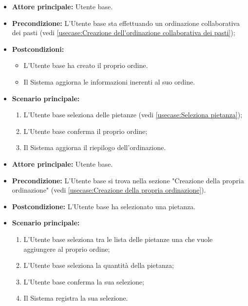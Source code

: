 \label{usecase:Creazione della propria ordinazione}
\begin{itemize}
	\item \textbf{Attore principale:} Utente base.

	\item \textbf{Precondizione:} L'Utente base sta effettuando un ordinazione collaborativa dei pasti (vedi \autoref{usecase:Creazione dell'ordinazione collaborativa dei pasti});

	\item \textbf{Postcondizioni:}
	      \begin{itemize}
		      \item L'Utente base ha creato il proprio ordine.
		      \item Il Sistema aggiorna le informazioni inerenti al suo ordine.
	      \end{itemize}

	\item \textbf{Scenario principale:}
	      \begin{enumerate}
		      \item L'Utente base seleziona delle pietanze (vedi \autoref{usecase:Seleziona pietanza});
		      \item L'Utente base conferma il proprio ordine;
		      \item Il Sistema aggiorna il riepilogo dell'ordinazione.
	      \end{enumerate}
\end{itemize}


\label{usecase:Seleziona pietanza}
\begin{itemize}
	\item \textbf{Attore principale:} Utente base.

	\item \textbf{Precondizione:} L'Utente base si trova nella sezione "Creazione della propria ordinazione" (vedi \autoref{usecase:Creazione della propria ordinazione}).

	\item \textbf{Postcondizione:} L'Utente base ha selezionato una pietanza.

	\item \textbf{Scenario principale:}
	      \begin{enumerate}
		      \item L'Utente base seleziona tra le lista delle pietanze una che vuole aggiungere al proprio ordine;
		      \item L'Utente base seleziona la quantità della pietanza;
		      \item L'Utente base conferma la sua selezione;
		      \item Il Sistema registra la sua selezione.
	      \end{enumerate}
\end{itemize}

